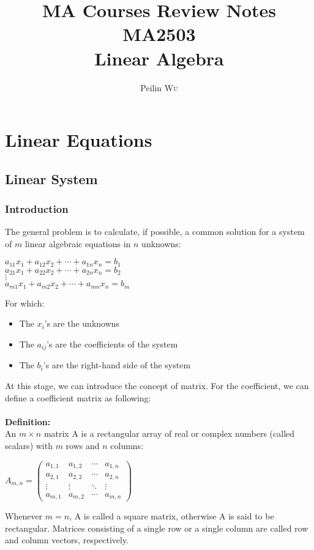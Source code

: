 \documentclass[UTF8,a4paper, 10pt, openany]{book}
\title{MA Courses Review Notes\\MA2503 \\Linear Algebra}
\author{Peilin \textsc{Wu}
}
\begin{document}
\maketitle

\frontmatter
\tableofcontents

\mainmatter
\chapter{Linear Equations}
\section{Linear System}
\subsection{Introduction}
The general problem is to calculate, if possible, a common solution
for a system of $m$ linear algebraic equations in $n$ unknowns:

\begin{center}
$a_{11}x_1+a_{12}x_{2}+\cdots +a_{1n}x_{n} = b_{1}$\\
$a_{21}x_1+a_{22}x_{2}+\cdots +a_{2n}x_{n} = b_{2}$\\
$\vdots$\\
$a_{m1}x_1+a_{m2}x_{2}+\cdots +a_{mn}x_{n} = b_{m}$\\
\end{center}

For which:
\begin{itemize}
\item{The $x_i$'s are the unknowns}
\item{The $a_{ij}$'s are the coefficients of the system}
\item{The $b_i$'s are the right-hand side of the system}
\end{itemize}
At this stage, we can introduce the concept of matrix. For the coefficient, we can define a coefficient matrix as following:\\ \\
\textbf{Definition:}
\\An $m \times n$ matrix A is a rectangular array of real or complex numbers (called scalars) with $m$ rows and $n$ columns:
\begin{center}
$A_{m,n}=  
 \begin{pmatrix}
  a_{1,1} & a_{1,2} & \cdots & a_{1,n} \\
  a_{2,1} & a_{2,2} & \cdots & a_{2,n} \\
  \vdots  & \vdots  & \ddots & \vdots  \\
  a_{m,1} & a_{m,2} & \cdots & a_{m,n} 
 \end{pmatrix}$\\
\end{center}
Whenever $m = n$, A is called a square matrix, otherwise A is said to be rectangular. Matrices consisting of a single row or a single column are called row and column vectors, respectively. 
\end{document}
